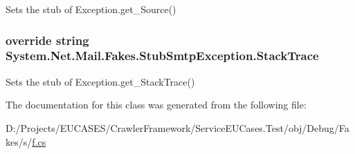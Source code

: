 Sets the stub of Exception.\-get\-\_\-\-Source()

\hypertarget{class_system_1_1_net_1_1_mail_1_1_fakes_1_1_stub_smtp_exception_a0e7222ada78173439be8bfaace282b3e}{
\subsubsection[{Stack\-Trace}]{\setlength{\rightskip}{0pt plus 5cm}override string System.\-Net.\-Mail.\-Fakes.\-Stub\-Smtp\-Exception.\-Stack\-Trace\hspace{0.3cm}{\ttfamily [get]}}}\label{class_system_1_1_net_1_1_mail_1_1_fakes_1_1_stub_smtp_exception_a0e7222ada78173439be8bfaace282b3e}


Sets the stub of Exception.\-get\-\_\-\-Stack\-Trace()



The documentation for this class was generated from the following file\-:\begin{DoxyCompactItemize}
\item 
D\-:/\-Projects/\-E\-U\-C\-A\-S\-E\-S/\-Crawler\-Framework/\-Service\-E\-U\-Cases.\-Test/obj/\-Debug/\-Fakes/s/\hyperlink{s_2f_8cs}{f.\-cs}\end{DoxyCompactItemize}
